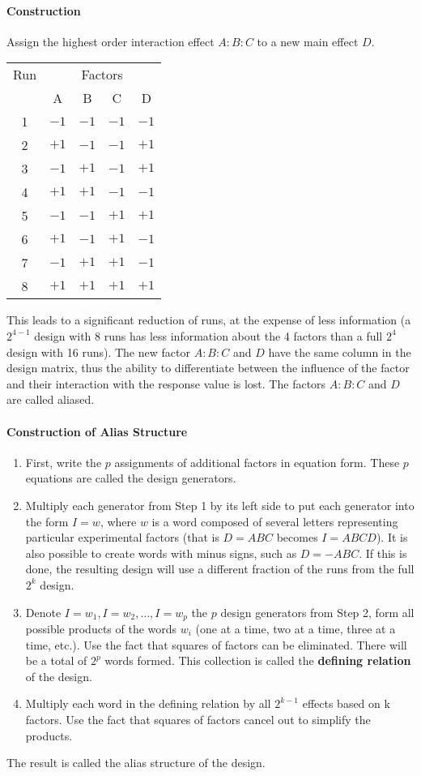 \documentclass[11pt]{article}
\theoremstyle{definition}
\begin{document}
\paragraph{Construction} Assign the highest order interaction effect $A:B:C$ to a new main effect $D$. 
\begin{tabularx}{\linewidth}{c | c c c | c}
	Run & \multicolumn{4}{c}{Factors} \\
	& A & B & C & D \\
	\hline
	1 & $-1$ & $-1$ & $-1$ & $-1$ \\
	2 & $+1$ & $-1$ & $-1$ & $+1$ \\
	3 & $-1$ & $+1$ & $-1$ & $+1$ \\
	4 & $+1$ & $+1$ & $-1$ & $-1$ \\
	5 & $-1$ & $-1$ & $+1$ & $+1$ \\
	6 & $+1$ & $-1$ & $+1$ & $-1$ \\
	7 & $-1$ & $+1$ & $+1$ & $-1$ \\
	8 & $+1$ & $+1$ & $+1$ & $+1$ \\
\end{tabularx}
This leads to a significant reduction of runs, at the expense of less information (a $2^{4-1}$ design with 8 runs has less information about the 4 factors than a full $2^4$ design with 16 runs). The new factor $A:B:C$ and $D$ have the same column in the design matrix, thus the ability to differentiate between the influence of the factor and their interaction with the response value is lost. The factors $A:B:C$ and $D$ are called aliased.

\paragraph{Construction of Alias Structure}
\begin{enumerate}
	\item First, write the $p$ assignments of additional factors in equation form. These $p$ equations are called the design generators.
	\item Multiply each generator from Step 1 by its left side to put each generator into the form $I = w$, where $w$ is a word composed of several letters representing particular experimental factors (that is $D = ABC$ becomes $I = ABCD$). It is also possible to create words with minus signs, such as $D = - ABC$. If this is done, the resulting design will use a different fraction of the runs from the full $2^k$ design.
	\item  Denote $I = w_1, I = w_2,\dots,I = w_p$ the $p$ design generators from Step 2, form all possible products of the words $w_i$ (one at a time, two at a time, three at a time, etc.). Use the fact that squares of factors can be eliminated. There will be a total of $2^p$ words formed. This collection is called the \textbf{defining relation} of the design.
	\item Multiply each word in the defining relation by all $2^{k - 1}$ effects based on k factors. Use the fact that squares of factors cancel out to simplify the products.
\end{enumerate}
The result is called the alias structure of the design.
\end{document}
